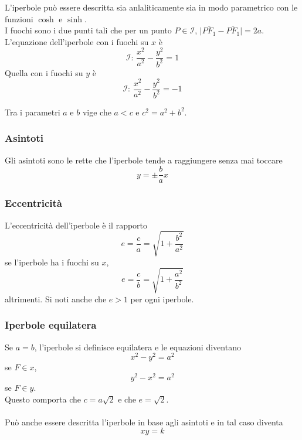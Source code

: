 L'iperbole può essere descritta sia anlaliticamente sia in modo parametrico con le funzioni $\cosh$ e
$\sinh$.\\
I fuochi sono i due punti tali che per un punto $P\in\mathscr{I}$, 
$\lvert \overline{PF_1}-\overline{PF_1}\rvert=2a$.\\
L'equazione dell'iperbole con i fuochi su $x$ è
\begin{equation*}
  \mathscr{I}:\,\frac{x^2}{a^2}-\frac{y^2}{b^2}=1
\end{equation*}
Quella con i fuochi su $y$ è
\begin{equation*}
  \mathscr{I}:\,\frac{x^2}{a^2}-\frac{y^2}{b^2}=-1
\end{equation*}

Tra i parametri $a$ e $b$ vige che $a < c$ e $c^2 = a^2+b^2$.

\subsubsection{Asintoti}
Gli asintoti sono le rette che l'iperbole tende a raggiungere senza mai toccare
\begin{equation*}
  y=\pm\frac{b}{a}x
\end{equation*}

\subsubsection{Eccentricità}
L'eccentricità dell'iperbole è il rapporto
\begin{equation*}
  e=\frac{c}{a}=\sqrt{1+\frac{b^2}{a^2}}
\end{equation*}
se l'iperbole ha i fuochi su $x$,
\begin{equation*}
  e = \frac{c}{b}=\sqrt{1+\frac{a^2}{b^2}}
\end{equation*}
altrimenti. Si noti anche che $e > 1$ per ogni iperbole.

\subsubsection{Iperbole equilatera}
Se $a=b$, l'iperbole si definisce equilatera e le equazioni diventano 
\begin{equation*}
  x^2-y^2=a^2
\end{equation*}
se $F\in x$,
\begin{equation*}
  y^2-x^2=a^2
\end{equation*}
se $F\in y$.\\
Questo comporta che $c = a\sqrt{2}$ e che $e=\sqrt{2}$.\\\\
Può anche essere descritta l'iperbole in base agli asintoti e in tal caso diventa
\begin{equation*}
  xy=k
\end{equation*}

